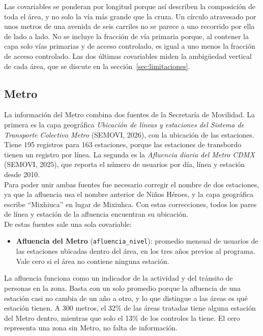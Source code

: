 Las covariables se ponderan por longitud porque así describen la composición de toda el área, y no solo la vía más grande que la cruza. Un círculo atravesado por unos metros de una avenida de seis carriles no se parece a uno recorrido por ella de lado a lado. No se incluye la fracción de vía primaria porque, al contener la capa solo vías primarias y de acceso controlado, es igual a uno menos la fracción de acceso controlado. Las dos últimas covariables miden la ambigüedad vertical de cada área, que se discute en la sección~\ref{sec:limitaciones}.

\subsection{Metro}

\noindent La información del Metro combina dos fuentes de la Secretaría de Movilidad. La primera es la capa geográfica \emph{Ubicación de líneas y estaciones del Sistema de Transporte Colectivo Metro} (SEMOVI, 2026), con la ubicación de las estaciones. Tiene 195 registros para 163 estaciones, porque las estaciones de transbordo tienen un registro por línea. La segunda es la \emph{Afluencia diaria del Metro CDMX} (SEMOVI, 2025), que reporta el número de usuarios por día, línea y estación desde 2010.\\

Para poder unir ambas fuentes fue necesario corregir el nombre de dos estaciones, ya que la afluencia usa el nombre anterior de Niños Héroes, y la capa geográfica escribe ``Mixhiuca'' en lugar de Mixiuhca. Con estas correcciones, todos los pares de línea y estación de la afluencia encuentran su ubicación.\\

De estas fuentes sale una sola covariable:

\begin{itemize}
    \item \textbf{Afluencia del Metro} (\texttt{afluencia\_nivel}): promedio mensual de usuarios de las estaciones ubicadas dentro del área, en los tres años previos al programa. Vale cero si el área no contiene ninguna estación.
\end{itemize}

La afluencia funciona como un indicador de la actividad y del tránsito de personas en la zona. Basta con un solo promedio porque la afluencia de una estación casi no cambia de un año a otro, y lo que distingue a las áreas es qué estación tienen. A 300 metros, el 32\% de las áreas tratadas tiene alguna estación del Metro dentro, mientras que solo el 13\% de los controles la tiene. El cero representa una zona sin Metro, no falta de información.

